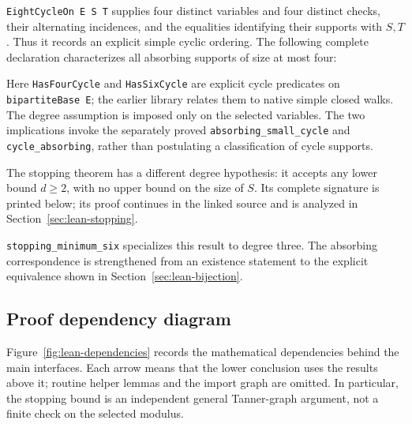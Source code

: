 \documentclass[11pt]{article}
\theoremstyle{definition}
\theoremstyle{remark}
\begin{document}
\texttt{EightCycleOn E S T} supplies four distinct variables and four
distinct checks, their alternating incidences, and the equalities
identifying their supports with $S,T$. Thus it records an explicit simple
cyclic ordering. The following complete declaration characterizes all
absorbing supports of size at most four:
\par\medskip\noindent\begin{minipage}{\linewidth}

\end{minipage}\par\medskip
Here \texttt{HasFourCycle} and \texttt{HasSixCycle} are explicit cycle
predicates on \texttt{bipartiteBase E}; the earlier library relates them
to native simple closed walks. The degree assumption is imposed only on
the selected variables. The two implications invoke the separately proved
\texttt{absorbing\_small\_cycle} and \texttt{cycle\_absorbing}, rather
than postulating a classification of cycle supports.

The stopping theorem has a different degree hypothesis: it accepts any
lower bound $d\ge2$, with no upper bound on the size of $S$. Its complete
signature is printed below; its proof continues in the linked source and
is analyzed in Section~\ref{sec:lean-stopping}.
\par\medskip\noindent\begin{minipage}{\linewidth}

\end{minipage}\par\medskip
\texttt{stopping\_minimum\_six} specializes this result to degree three.
The absorbing correspondence is strengthened from an existence statement
to the explicit equivalence shown in Section~\ref{sec:lean-bijection}.

\subsection{Proof dependency diagram}\label{sec:lean-dependencies}

Figure~\ref{fig:lean-dependencies} records the mathematical dependencies
behind the main interfaces. Each arrow means that the lower conclusion
uses the results above it; routine helper lemmas and the import graph are
omitted. In particular, the stopping bound is an independent general
Tanner-graph argument, not a finite check on the selected modulus.
\end{document}
